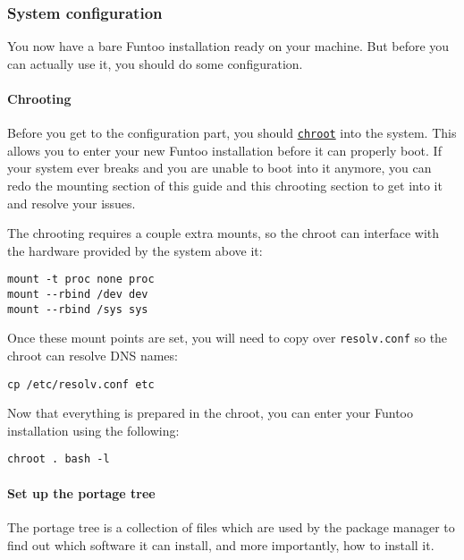 \subsubsection{System configuration}\label{system-configuration}

You now have a bare Funtoo installation ready on your machine. But
before you can actually use it, you should do some configuration.

\paragraph{Chrooting}\label{chrooting}

Before you get to the configuration part, you should
\href{https://en.wikipedia.org/wiki/Chroot}{\texttt{chroot}} into the
system. This allows you to enter your new Funtoo installation before it
can properly boot. If your system ever breaks and you are unable to boot
into it anymore, you can redo the mounting section of this guide and
this chrooting section to get into it and resolve your issues.

The chrooting requires a couple extra mounts, so the chroot can
interface with the hardware provided by the system above it:

\begin{verbatim}
mount -t proc none proc
mount --rbind /dev dev
mount --rbind /sys sys
\end{verbatim}

Once these mount points are set, you will need to copy over
\texttt{resolv.conf} so the chroot can resolve DNS names:

\begin{verbatim}
cp /etc/resolv.conf etc
\end{verbatim}

Now that everything is prepared in the chroot, you can enter your Funtoo
installation using the following:

\begin{verbatim}
chroot . bash -l
\end{verbatim}

\paragraph{Set up the portage tree}\label{set-up-the-portage-tree}

The portage tree is a collection of files which are used by the package
manager to find out which software it can install, and more importantly,
how to install it.

